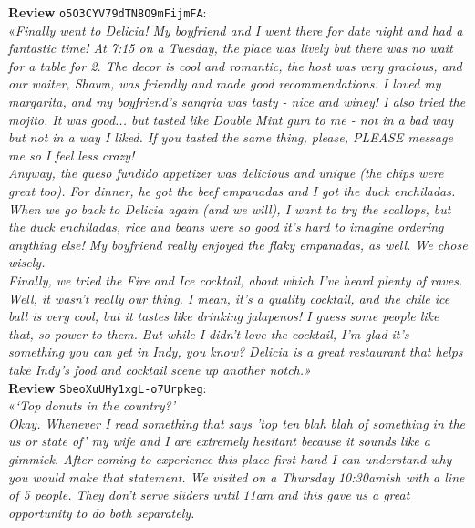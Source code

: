 \documentclass{article}
\begin{document}
  \textbf{Review} \texttt{o5O3CYV79dTN8O9mFijmFA}: \\
  «\textit{Finally went to Delicia! My boyfriend and I went there for date
  night and had a fantastic time! At 7:15 on a Tuesday, the place was lively
  but there was no wait for a table for 2. The decor is cool and romantic, the
  host was very gracious, and our waiter, Shawn, was friendly and made good
  recommendations. I loved my margarita, and my boyfriend's sangria was tasty -
  nice and winey! I also tried the mojito. It was good... but tasted like
  Double Mint gum to me - not in a bad way but not in a way I liked. If you
  tasted the same thing, please, PLEASE message me so I feel less crazy!} \\

  \textit{Anyway, the queso fundido appetizer was delicious and unique (the
  chips were great too). For dinner, he got the beef empanadas and I got the
  duck enchiladas. When we go back to Delicia again (and we will), I want to
  try the scallops, but the duck enchiladas, rice and beans were so good it's
  hard to imagine ordering anything else! My boyfriend really enjoyed the flaky
  empanadas, as well. We chose wisely.} \\

  \textit{Finally, we tried the Fire and Ice cocktail, about which I've heard
  plenty of raves. Well, it wasn't really our thing. I mean, it's a quality
  cocktail, and the chile ice ball is very cool, but it tastes like drinking
  jalapenos! I guess some people like that, so power to them. But while I
  didn't love the cocktail, I'm glad it's something you can get in Indy, you
  know? Delicia is a great restaurant that helps take Indy's food and cocktail
  scene up another notch.»} \\

  \textbf{Review} \texttt{SbeoXuUHy1xgL-o7Urpkeg}: \\
  «\textit{`Top donuts in the country?'} \\

  \textit{Okay. Whenever I read something that says 'top ten blah blah of
  something in the us or state of' my wife and I are extremely hesitant because
  it sounds like a gimmick. After coming to experience this place first hand I
  can understand why you would make that statement. We visited on a Thursday
  10:30amish with a line of 5 people. They don't serve sliders until 11am and
  this gave us a great opportunity to do both separately.} \\
\end{document}
